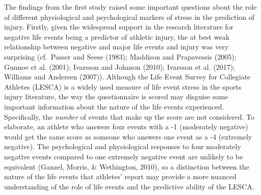 \documentclass[man,floatsintext]{apa6}
\begin{document}
The findings from the first study raised some important questions about the role of different physiological and psychological markers of stress in the prediction of injury. Firstly, given the widespread support in the research literature for negative life events being a predictor of athletic injury, the at best weak relationship between negative and major life events and injury was very surprising (cf.~Passer and Seese (1983); Maddison and Prapavessis (2005); Gunnoe et al. (2001); Ivarsson and Johnson (2010); Ivarsson et al. (2017); Williams and Andersen (2007)).
Although the Life Event Survey for Collegiate Athletes (LESCA) is a widely used measure of life event stress in the sports injury literature, the way the questionnaire is scored may disguise some important information about the nature of the life events experienced.
Specifically, the \emph{number} of events that make up the score are not considered.
To elaborate, an athlete who answers four events with a -1 (moderately negative) would get the same score as someone who answers one event as a -4 (extremely negative).
The psychological and physiological responses to four moderately negative events compared to one extremely negative event are unlikely to be equivalent (Ganzel, Morris, \& Wethington, 2010), so a distinction between the nature of the life events that athletes' report may provide a more nuanced understanding of the role of life events and the predictive ability of the LESCA.
\end{document}
